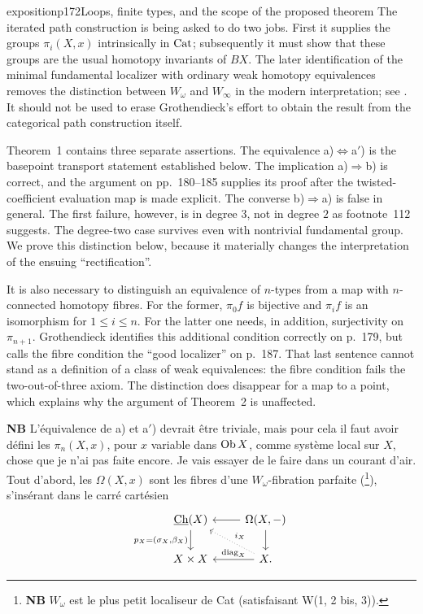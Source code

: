 \begin{dcomment}{exposition}{p172}{Loops, finite types, and the scope of the proposed theorem}
The iterated path construction is being asked to do two jobs. First it supplies the groups $\pi_i(X,x)$ intrinsically in $\mathrm{Cat}$; subsequently it must show that these groups are the usual homotopy invariants of $BX$. The later identification of the minimal fundamental localizer with ordinary weak homotopy equivalences removes the distinction between $W_\omega$ and $W_\infty$ in the modern interpretation; see \citet[Theorem~2.2.11]{Cisinski2004Minimal}. It should not be used to erase Grothendieck's effort to obtain the result from the categorical path construction itself.

Theorem~1 contains three separate assertions. The equivalence a)$\Leftrightarrow$a$'$) is the basepoint transport statement established below. The implication a)$\Rightarrow$b) is correct, and the argument on pp.~180--185 supplies its proof after the twisted-coefficient evaluation map is made explicit. The converse b)$\Rightarrow$a) is false in general. The first failure, however, is in degree $3$, not in degree $2$ as footnote~112 suggests. The degree-two case survives even with nontrivial fundamental group. We prove this distinction below, because it materially changes the interpretation of the ensuing ``rectification''.

It is also necessary to distinguish an equivalence of $n$-types from a map with $n$-connected homotopy fibres. For the former, $\pi_0f$ is bijective and $\pi_if$ is an isomorphism for $1\leq i\leq n$. For the latter one needs, in addition, surjectivity on $\pi_{n+1}$. Grothendieck identifies this additional condition correctly on p.~179, but calls the fibre condition the ``good localizer'' on p.~187. That last sentence cannot stand as a definition of a class of weak equivalences: the fibre condition fails the two-out-of-three axiom. The distinction does disappear for a map to a point, which explains why the argument of Theorem~2 is unaffected.
\end{dcomment}


\textbf{NB} L'équivalence de a) et a$'$) devrait être triviale, mais pour cela il faut avoir défini les $\pi_n(X,x)$, pour $x$ variable dans $\mathrm{Ob}\, X$, comme système local sur $X$, chose que je n'ai pas faite encore. Je vais essayer de le faire dans un courant d'air. Tout d'abord, les $\Omega(X,x)$ sont les fibres d'une $W_\omega$-fibration parfaite (\footnote[113]{\textbf{NB} $W_\omega$ est le plus petit localiseur de Cat (satisfaisant W(1, 2 bis, 3)).}), s'insérant dans le carré cartésien
\[
\begin{tikzcd}
\Ch(X) \arrow[d, "{p_X=(\sigma_X,\beta_X)}"'] & \Omega(X,-) \arrow[l] \arrow[d] \\
X \times X & X. \arrow[l, "\mathrm{diag}_X"'] \arrow[ul, dotted, "i_X"']
\end{tikzcd}
\]

